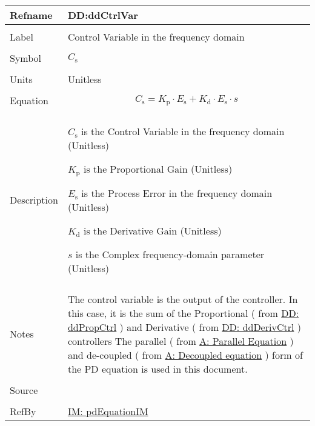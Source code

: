 \documentclass[12pt]{article}
\begin{document}
\vspace{\baselineskip}
\noindent
\begin{minipage}{\textwidth}
\begin{tabular}{>{\raggedright}p{}>{\raggedright\arraybackslash}p{}}
\toprule \textbf{Refname} & \textbf{DD:ddCtrlVar}
\label{DD:ddCtrlVar}
\\ \midrule \\
Label & Control Variable in the frequency domain
        
\\ \midrule \\
Symbol & ${C_{\text{s}}}$
         
\\ \midrule \\
Units & Unitless
        
\\ \midrule \\
Equation & \begin{displaymath}
           {C_{\text{s}}}={K_{\text{p}}}\cdot{}{E_{\text{s}}}+{K_{\text{d}}}\cdot{}{E_{\text{s}}}\cdot{}s
           \end{displaymath}
\\ \midrule \\
Description & \begin{symbDescription}
              \item{${C_{\text{s}}}$ is the Control Variable in the frequency domain (Unitless)}
              \item{${K_{\text{p}}}$ is the Proportional Gain (Unitless)}
              \item{${E_{\text{s}}}$ is the Process Error in the frequency domain (Unitless)}
              \item{${K_{\text{d}}}$ is the Derivative Gain (Unitless)}
              \item{$s$ is the Complex frequency-domain parameter (Unitless)}
              \end{symbDescription}
\\ \midrule \\
Notes & The control variable is the output of the controller. In this case, it is the sum of the Proportional ( from \hyperref[DD:ddPropCtrl]{DD: ddPropCtrl} ) and Derivative ( from  \hyperref[DD:ddDerivCtrl]{DD: ddDerivCtrl} ) controllers The parallel ( from \hyperref[parallelEq]{A: Parallel Equation} ) and de-coupled ( from \hyperref[decoupled]{A: Decoupled equation} ) form of the PD equation is used in this document.
        
\\ \midrule \\
Source & \cite{johnson2008}
         
\\ \midrule \\
RefBy & \hyperref[IM:pdEquationIM]{IM: pdEquationIM}
        
\\ \bottomrule
\end{tabular}
\end{minipage}
\end{document}

